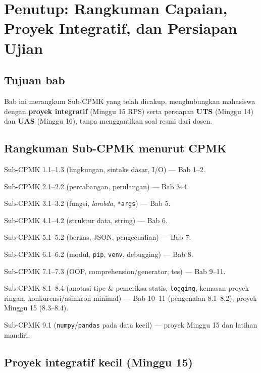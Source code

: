 \documentclass[../main.tex]{subfiles}
\begin{document}
\chapter{Penutup: Rangkuman Capaian, Proyek Integratif, dan Persiapan Ujian}

\section{Tujuan bab}

Bab ini merangkum Sub-CPMK yang telah dicakup, menghubungkan mahasiswa dengan \textbf{proyek integratif} (Minggu 15 RPS) serta persiapan \textbf{UTS} (Minggu 14) dan \textbf{UAS} (Minggu 16), tanpa menggantikan soal resmi dari dosen.

\section{Rangkuman Sub-CPMK menurut CPMK}

\begin{description}[style=nextline, widest=CPMK-9:, itemsep=0.35em]
  \item[CPMK-1:] Sub-CPMK 1.1--1.3 (lingkungan, sintaks dasar, I/O) --- Bab 1--2.
  \item[CPMK-2:] Sub-CPMK 2.1--2.2 (percabangan, perulangan) --- Bab 3--4.
  \item[CPMK-3:] Sub-CPMK 3.1--3.2 (fungsi, \textit{lambda}, \texttt{*args}) --- Bab 5.
  \item[CPMK-4:] Sub-CPMK 4.1--4.2 (struktur data, string) --- Bab 6.
  \item[CPMK-5:] Sub-CPMK 5.1--5.2 (berkas, JSON, pengecualian) --- Bab 7.
  \item[CPMK-6:] Sub-CPMK 6.1--6.2 (modul, \texttt{pip}, \texttt{venv}, debugging) --- Bab 8.
  \item[CPMK-7:] Sub-CPMK 7.1--7.3 (OOP, comprehension/generator, tes) --- Bab 9--11.
  \item[CPMK-8:] Sub-CPMK 8.1--8.4 (anotasi tipe \& pemeriksa statis, \texttt{logging}, kemasan proyek ringan, konkurensi/asinkron minimal) --- Bab 10--11 (pengenalan 8.1--8.2), proyek Minggu 15 (8.3--8.4).
  \item[CPMK-9:] Sub-CPMK 9.1 (\texttt{numpy}/\texttt{pandas} pada data kecil) --- proyek Minggu 15 dan latihan mandiri.
\end{description}

\section{Proyek integratif kecil (Minggu 15)}
\end{document}

